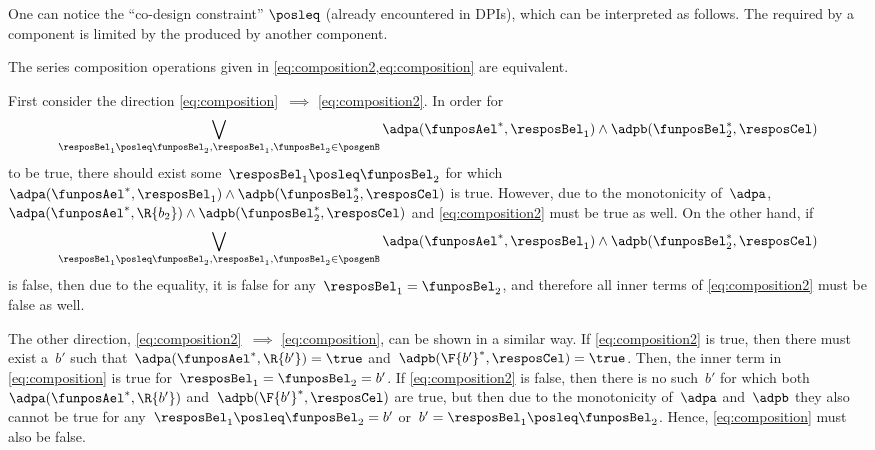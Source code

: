 One can notice the ``co-design constraint'' $\posleq$ (already encountered in DPIs), which can be interpreted as follows.
The  required by a component is limited by the  produced by another component.

\begin{remark}
    \label{lem:composition_equivalency}
    The series composition operations given in \cref{eq:composition2,eq:composition} are equivalent.

    First consider the direction \cref{eq:composition}~$\implies$ \cref{eq:composition2}. In order for%
    \begin{equation*}
        \bigvee_{\resposBel_1\posleq\funposBel_2, \resposBel_1,\funposBel_2\in \posgenB} \adpa(\funposAel^*,\resposBel_1) \wedge \adpb(\funposBel_2^*,\resposCel)%
    \end{equation*}
    to be true, there should exist some~$\resposBel_1\posleq \funposBel_2$ for which~$\adpa(\funposAel^*,\resposBel_1) \wedge \adpb(\funposBel_2^*,\resposCel)$ is true.
    However, due to the monotonicity of~$\adpa$,~$\adpa(\funposAel^*,\R{b_2}) \wedge \adpb(\funposBel_2^*,\resposCel)$ and \cref{eq:composition2} must be true as well.
    On the other hand, if%
    \begin{equation*}
        \bigvee_{\resposBel_1\posleq\funposBel_2, \resposBel_1,\funposBel_2\in \posgenB} \adpa(\funposAel^*,\resposBel_1) \wedge \adpb(\funposBel_2^*,\resposCel)%
    \end{equation*}
    is false, then due to the equality, it is false for any~$\resposBel_1=\funposBel_2$, and therefore all inner terms of \cref{eq:composition2} must be false as well.

    The other direction, \cref{eq:composition2}~$\implies$ \cref{eq:composition}, can be shown in a similar way.
    If \cref{eq:composition2} is true, then there must exist a~$b'$ such that~$\adpa(\funposAel^*, \R{b'})=\true$ and~$\adpb(\F{b'}^*, \resposCel)=\true$.
    Then, the inner term in \cref{eq:composition} is true for~$\resposBel_1=\funposBel_2=b'$.
    If \cref{eq:composition2} is false, then there is no such~$b'$ for which both~$\adpa(\funposAel^*, \R{b'})$ and~$\adpb(\F{b'}^*, \resposCel)$ are true, but then due to the monotonicity of~$\adpa$ and~$\adpb$ they also cannot be true for any~$\resposBel_1 \posleq \funposBel_2 = b'$ or~$b'=\resposBel_1 \posleq \funposBel_2$.
    Hence, \cref{eq:composition} must also be false.
\end{remark}
